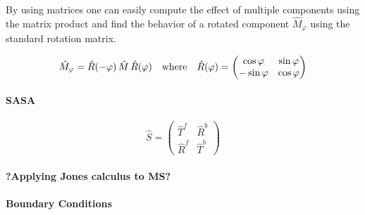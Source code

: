 \noindent
By using matrices one can easily compute the effect of multiple components using the matrix product and find the behavior of a rotated component $\hat{M}_{\varphi}$ using the standard rotation matrix.

\begin{equation}
    \hat{M}_{\varphi} = \hat{R}(-\varphi) \, \hat{M} \, \hat{R}(\varphi)
    \qq{where}
    \hat{R}(\varphi) =
    \begin{pmatrix}
        \cos \varphi & \sin \varphi \\
        -\sin \varphi & \cos \varphi
    \end{pmatrix}
\end{equation}
\paragraph{SASA}

\begin{equation}
    \hat{S} =
    \begin{pmatrix}
        \hat{T}^f & \hat{R}^b \\
        \hat{R}^f & \hat{T}^b
    \end{pmatrix}
\end{equation}

\paragraph{?Applying Jones calculus to MS?}


\paragraph{Boundary Conditions}

